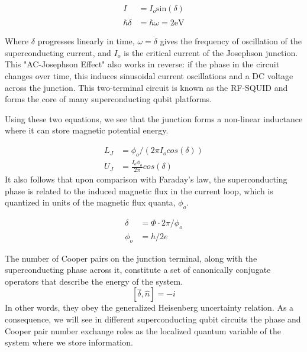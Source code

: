 \documentclass[%
 reprint,
showpacs,
 amsmath,amssymb,
 aps,
longbibliography,
]{revtex4-1}
\begin{document}
\begin{align*}
I &=I_o \textrm{sin}\left(\delta\right) \\
\hbar\dot{\delta} &= \hbar\omega = 2\textrm{eV}
\end{align*}

Where $\delta$ progresses linearly in time, $\omega=\dot{\delta}$ gives the frequency of oscillation of the superconducting current, and $I_o$ is the critical current of the Josephson junction. This "AC-Josephson Effect" also works in reverse: if the phase in the circuit changes over time, this induces sinusoidal current oscillations and a DC voltage across the junction. This two-terminal circuit is known as the RF-SQUID \cite{squid} and forms the core of many superconducting qubit platforms.

Using these two equations, we see that the junction forms a non-linear inductance where it can store magnetic potential energy.

\begin{align*}
L_J &= \phi_o / \left(2\pi I_o cos(\delta)\right) \\
U_J &= \frac{I_o\phi_o}{2\pi} cos(\delta)
\end{align*} It also follows that upon comparison with Faraday's law, the superconducting phase is related to the induced magnetic flux in the current loop, which is quantized in units of the magnetic flux quanta, $\phi_o$.

\begin{align*}
\delta &= \Phi \cdot 2\pi / \phi_o \\
\phi_o &= h/2e
\end{align*}

The number of Cooper pairs on the junction terminal, along with the superconducting phase across it, constitute a set of canonically conjugate operators that describe the energy of the system.
\begin{equation*}
\left[\hat{\delta},\hat{n}\right] = -i
\end{equation*}
In other words, they obey the generalized Heisenberg uncertainty relation. As a consequence, we will see in different superconducting qubit circuits the phase and Cooper pair number exchange roles as the localized quantum variable of the system where we store information.
\end{document}
